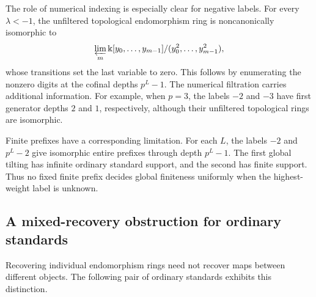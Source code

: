 \documentclass[11pt,reqno]{amsart}
\newcommand{\kk}{\Bbbk}\newcommand{\ZZ}{\mathbb Z}\newcommand{\NN}{\mathbb N}
\theoremstyle{definition}
\theoremstyle{remark}
\numberwithin{equation}{section}
\begin{document}
The role of numerical indexing is especially clear for negative
labels. For every $\lambda<-1$, the unfiltered topological endomorphism ring is
noncanonically isomorphic to
\[
 \varprojlim_m\kk[y_0,\ldots,y_{m-1}]/(y_0^2,\ldots,y_{m-1}^2),
\]
whose transitions set the last variable to zero. This follows by
enumerating the nonzero digits at the cofinal depths $p^L-1$.
The numerical filtration carries additional information. For example,
when $p=3$, the labels $-2$ and $-3$ have first generator depths $2$
and $1$, respectively, although their unfiltered topological rings
are isomorphic.

Finite prefixes have a corresponding limitation. For each $L$, the labels
$-2$ and $p^L-2$ give isomorphic entire prefixes through depth $p^L-1$.
The first global tilting has infinite ordinary standard support, and
the second has finite support. Thus no fixed finite prefix decides
global finiteness uniformly when the highest-weight label is unknown.

\subsection{A mixed-recovery obstruction for ordinary standards}
Recovering individual endomorphism rings need not recover maps between
different objects. The following pair of ordinary standards exhibits
this distinction.
\end{document}
